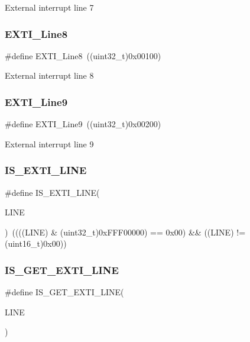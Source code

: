 External interrupt line 7 \mbox{\label{group___e_x_t_i___lines_gacd51e087a088c3315049394cddf79e88}} 
\subsubsection{\texorpdfstring{EXTI\_Line8}{EXTI\_Line8}}
{\footnotesize\ttfamily \#define E\+X\+T\+I\+\_\+\+Line8~((uint32\+\_\+t)0x00100)}

External interrupt line 8 \mbox{\label{group___e_x_t_i___lines_ga340ca6bb77b7a2d7747c78e7d3370360}} 
\subsubsection{\texorpdfstring{EXTI\_Line9}{EXTI\_Line9}}
{\footnotesize\ttfamily \#define E\+X\+T\+I\+\_\+\+Line9~((uint32\+\_\+t)0x00200)}

External interrupt line 9 \mbox{\label{group___e_x_t_i___lines_gaade8b8717a1d78f83d3cf180e2817557}} 
\subsubsection{\texorpdfstring{IS\_EXTI\_LINE}{IS\_EXTI\_LINE}}
{\footnotesize\ttfamily \#define I\+S\+\_\+\+E\+X\+T\+I\+\_\+\+L\+I\+NE(\begin{DoxyParamCaption}\item[{}]{L\+I\+NE }\end{DoxyParamCaption})~((((L\+I\+NE) \& (uint32\+\_\+t)0x\+F\+F\+F00000) == 0x00) \&\& ((\+L\+I\+N\+E) != (uint16\+\_\+t)0x00))}

\mbox{\label{group___e_x_t_i___lines_ga77c85c7b8426c6cfe91b4f5a2c58ecda}} 
\subsubsection{\texorpdfstring{IS\_GET\_EXTI\_LINE}{IS\_GET\_EXTI\_LINE}}
{\footnotesize\ttfamily \#define I\+S\+\_\+\+G\+E\+T\+\_\+\+E\+X\+T\+I\+\_\+\+L\+I\+NE(\begin{DoxyParamCaption}\item[{}]{L\+I\+NE }\end{DoxyParamCaption})}

